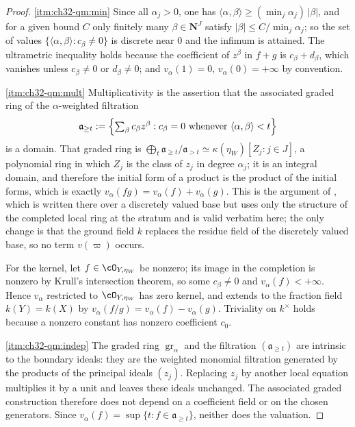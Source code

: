 \begin{proof}
\cref{itm:ch32-qm:min}  Since all $\alpha_j>0$, one has
$\langle\alpha,\beta\rangle\geq(\min_j\alpha_j)\,|\beta|$, and for a given
bound $C$ only finitely many $\beta\in\mathbf N^J$ satisfy
$|\beta|\leq C/\min_j\alpha_j$; so the set of values
$\{\langle\alpha,\beta\rangle:c_\beta\neq0\}$ is discrete near $0$ and
the infimum is attained.  The ultrametric inequality holds because the
coefficient of $z^\beta$ in $f+g$ is $c_\beta+d_\beta$, which vanishes
unless $c_\beta\neq0$ or $d_\beta\neq0$; and $v_\alpha(1)=0$,
$v_\alpha(0)=+\infty$ by convention.

\cref{itm:ch32-qm:mult}  Multiplicativity is the assertion that the
associated graded ring of the $\alpha$-weighted filtration
\[
 \mathfrak a_{\geq t}:=\Bigl\{\textstyle\sum_\beta c_\beta z^\beta:
 c_\beta=0\ \text{whenever}\ \langle\alpha,\beta\rangle<t\Bigr\}
\]
is a domain.  That graded ring is
$\bigoplus_t\mathfrak a_{\geq t}/\mathfrak a_{>t}
\simeq\kappa(\eta_W)[Z_j:j\in J]$, a polynomial ring in which $Z_j$ is the
class of $z_j$ in degree $\alpha_j$; it is an integral domain, and
therefore the initial form of a product is the product of the initial forms,
which is exactly $v_\alpha(fg)=v_\alpha(f)+v_\alpha(g)$.  This is the
argument of , which is written there over a
discretely valued base but uses only the structure of the completed local
ring at the stratum and is valid verbatim here; the only change is that the
ground field $k$ replaces the residue field of the discretely valued base,
so no term $v(\varpi)$ occurs.

For the kernel, let $f\in\cO_{Y,\eta_W}$ be nonzero; its image in the
completion is nonzero by Krull's intersection theorem, so some
$c_\beta\neq0$ and $v_\alpha(f)<+\infty$.  Hence $v_\alpha$ restricted
to $\cO_{Y,\eta_W}$ has zero kernel, and extends to the fraction field
$k(Y)=k(X)$ by $v_\alpha(f/g)=v_\alpha(f)-v_\alpha(g)$.  Triviality on
$k^\times$ holds because a nonzero constant has nonzero coefficient
$c_0$.

\cref{itm:ch32-qm:indep}  The graded ring $\operatorname{gr}_\alpha$ and the
filtration $(\mathfrak a_{\geq t})$ are intrinsic to the boundary ideals:
they are the weighted monomial filtration generated by the products of the
principal ideals $(z_j)$.  Replacing $z_j$ by another local equation
multiplies it by a unit and leaves these ideals unchanged.  The associated
graded construction therefore does not depend on a coefficient field or on
the chosen generators.  Since
$v_\alpha(f)=\sup\{t:f\in\mathfrak a_{\geq t}\}$, neither does the
valuation.


\end{proof}
